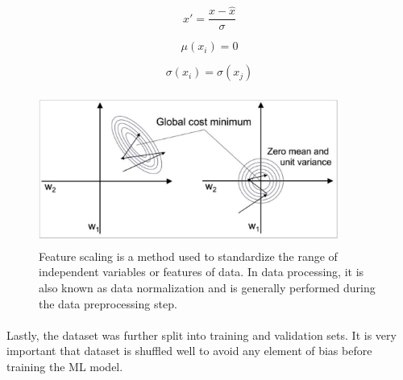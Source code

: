 \documentclass{llncs}       %
\begin{document}
\begin{equation} 
x'=\frac{x-\hat{x}}{\sigma}
\end{equation}

\begin{equation}
\mu (x_{i})= 0   
\end{equation}

\begin{equation} 
\sigma (x_{i}) = \sigma(x_{j})
\end{equation}


\begin{figure}[h]
\centering
\includegraphics[width=9.81cm,height=5.00cm]{media/image7.eps}
\caption{Feature scaling is a method used to standardize the 
range of independent variables or features of data. In data processing, 
it is also known as data normalization and is generally performed during 
the data preprocessing step.}
\end{figure}

\paragraph{}
\paragraph{}

Lastly, the dataset was further split into training and validation sets. It is very important that dataset is shuffled well to avoid any element of bias before training the ML model.

\paragraph{}
\paragraph{}
\paragraph{}
\end{document}
